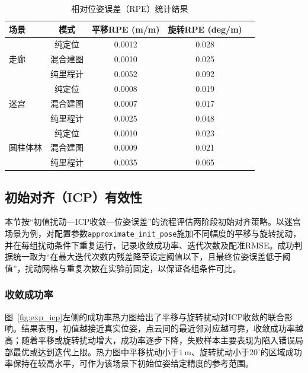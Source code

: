 \begin{table}[htbp]
\centering
\caption{相对位姿误差（RPE）统计结果}
\label{tab:rpe_results}
\begin{tabular}{lcccc}
\toprule
\textbf{场景} & \textbf{模式} & \textbf{平移RPE (m/m)} & \textbf{旋转RPE (deg/m)} \\
\midrule
\multirow{3}{*}{走廊}   & 纯定位      & 0.0012  & 0.028  \\
                        & 混合建图    & 0.0010  & 0.025  \\
                        & 纯里程计    & 0.0052  & 0.092  \\
\midrule
\multirow{3}{*}{迷宫}   & 纯定位      & 0.0008  & 0.019  \\
                        & 混合建图    & 0.0007  & 0.017  \\
                        & 纯里程计    & 0.0025  & 0.048  \\
\midrule
\multirow{3}{*}{圆柱体林} & 纯定位    & 0.0010  & 0.023  \\
                        & 混合建图    & 0.0009  & 0.021  \\
                        & 纯里程计    & 0.0035  & 0.065  \\
\bottomrule
\end{tabular}
\end{table}

\subsection{初始对齐（ICP）有效性}
本节按“初值扰动—ICP收敛—位姿误差”的流程评估两阶段初始对齐策略。以迷宫场景为例，对配置参数\texttt{approximate\_init\_pose}施加不同幅度的平移与旋转扰动，并在每组扰动条件下重复运行，记录收敛成功率、迭代次数及配准RMSE。成功判据统一取为“在最大迭代次数内残差降至设定阈值以下，且最终位姿误差低于阈值”，扰动网格与重复次数在实验前固定，以保证各组条件可比。

\subsubsection{收敛成功率}
图~\ref{fig:exp_icp}左侧的成功率热力图给出了平移与旋转扰动对ICP收敛的联合影响。结果表明，初值越接近真实位姿，点云间的最近邻对应越可靠，收敛成功率越高；随着平移或旋转扰动增大，成功率逐步下降，失败样本主要表现为陷入错误局部最优或达到迭代上限。热力图中平移扰动小于$1\,\mathrm{m}$、旋转扰动小于$20^{\circ}$的区域成功率保持在较高水平，可作为该场景下初始位姿给定精度的参考范围。

